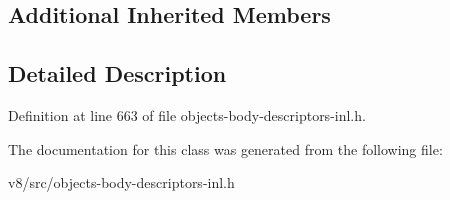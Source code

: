 \subsection*{Additional Inherited Members}


\subsection{Detailed Description}


Definition at line 663 of file objects-\/body-\/descriptors-\/inl.\+h.



The documentation for this class was generated from the following file\+:\begin{DoxyCompactItemize}
\item 
v8/src/objects-\/body-\/descriptors-\/inl.\+h\end{DoxyCompactItemize}
